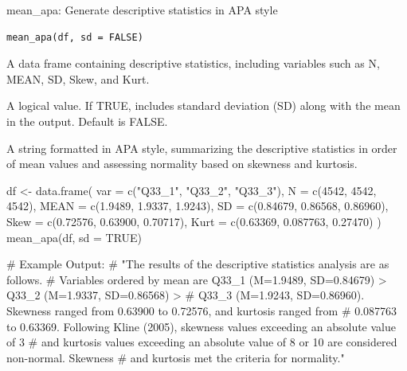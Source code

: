 \documentclass[a4paper]{book}
\begin{document}
%
\begin{Description}
mean\_apa: Generate descriptive statistics in APA style
\end{Description}
%
\begin{Usage}
\begin{verbatim}
mean_apa(df, sd = FALSE)
\end{verbatim}
\end{Usage}
%
\begin{Arguments}
\begin{ldescription}
\item[\code{df}] A data frame containing descriptive statistics, including variables such as N, MEAN, SD, Skew, and Kurt.

\item[\code{sd}] A logical value. If TRUE, includes standard deviation (SD) along with the mean in the output. Default is FALSE.
\end{ldescription}
\end{Arguments}
%
\begin{Value}
A string formatted in APA style, summarizing the descriptive statistics in order of mean values and assessing normality based on skewness and kurtosis.
\end{Value}
%
\begin{Examples}
\begin{ExampleCode}
df <- data.frame(
  var = c("Q33_1", "Q33_2", "Q33_3"),
  N = c(4542, 4542, 4542),
  MEAN = c(1.9489, 1.9337, 1.9243),
  SD = c(0.84679, 0.86568, 0.86960),
  Skew = c(0.72576, 0.63900, 0.70717),
  Kurt = c(0.63369, 0.087763, 0.27470)
)
mean_apa(df, sd = TRUE)

# Example Output:
# "The results of the descriptive statistics analysis are as follows.
# Variables ordered by mean are Q33_1 (M=1.9489, SD=0.84679) > Q33_2 (M=1.9337, SD=0.86568) >
# Q33_3 (M=1.9243, SD=0.86960). Skewness ranged from 0.63900 to 0.72576, and kurtosis ranged from
# 0.087763 to 0.63369. Following Kline (2005), skewness values exceeding an absolute value of 3
# and kurtosis values exceeding an absolute value of 8 or 10 are considered non-normal. Skewness
# and kurtosis met the criteria for normality."
\end{ExampleCode}
\end{Examples}
\end{document}
